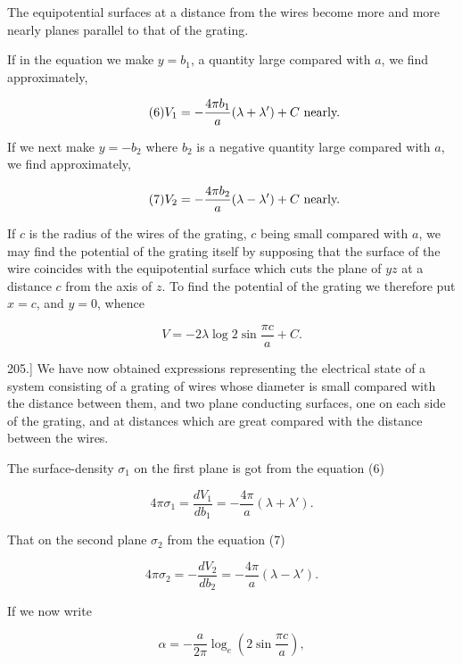\documentclass[11pt,a4paper]{article}
\begin{document}
The equipotential surfaces at a distance from the wires become more and more nearly planes parallel to that of the grating.

If in the equation we make $y=b_1$, a quantity large compared with
$a$, we find approximately,

\begin{equation}\tag{6}
V_1=-\frac{4\pi b_1}{a}(\lambda+\lambda')+C\hbox{ nearly.}
\end{equation}

If we next make $y=-b_2$ where $b_2$ is a negative quantity large
compared with $a$, we find approximately,

\begin{equation}\tag{7}
V_2=-\frac{4\pi b_2}{a}(\lambda-\lambda')+C\hbox{ nearly.}
\end{equation}

If $c$ is the radius of the wires of the grating, $c$ being small
compared with $a$, we may find the potential of the grating itself by
supposing that the surface of the wire coincides with the equipotential
surface which cuts the plane of $yz$ at a distance $c$ from the axis of
$z$. To find the potential of the grating we therefore put $x=c$, and
$y=0$, whence

\begin{equation}\tag{8}
V=-2\lambda\log 2\sin\frac{\pi c}{a}+C.
\end{equation}

205.] We have now obtained expressions representing the electrical
state of a system consisting of a grating of wires whose diameter is
small compared with the distance between them, and two plane conducting
surfaces, one on each side of the grating, and at distances which are
great compared with the distance between the wires.

The surface-density $\sigma_1$ on the first plane is got from the
equation (6)

\begin{equation}\tag{9}
4\pi\sigma_1=\frac{dV_1}{db_1}=-\frac{4\pi}{a}(\lambda+\lambda').
\end{equation}

That on the second plane $\sigma_2$ from the equation (7)

\begin{equation}\tag{10}
4\pi\sigma_2=-\frac{dV_2}{db_2}=-\frac{4\pi}{a}(\lambda-\lambda').
\end{equation}

If we now write

\begin{equation}\tag{11}
\alpha=-\frac{a}{2\pi}\log_e\left(2\sin\frac{\pi c}{a}\right),
\end{equation}
\end{document}
